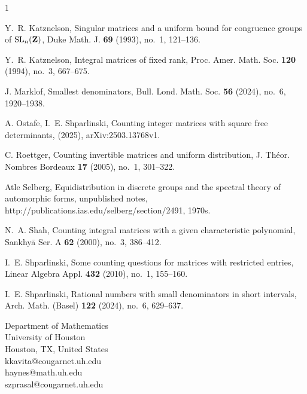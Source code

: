 \documentclass[reqno]{amsart}
\begin{document}
\begin{thebibliography}{1}
\vspace*{.1in}

Y.~R. Katznelson, Singular matrices and a uniform bound for congruence groups of ${\rm SL}_n({\bf Z})$, Duke Math. J. {\bf 69} (1993), no.~1, 121--136.

\vspace*{.1in}

Y.~R. Katznelson, Integral matrices of fixed rank, Proc. Amer. Math. Soc. {\bf 120} (1994), no.~3, 667--675.

\vspace*{.1in}

J. Marklof, Smallest denominators, Bull. Lond. Math. Soc. {\bf 56} (2024), no.~6, 1920--1938.
\vspace*{.1in}

%


A. Ostafe, I.~E. Shparlinski, Counting integer matrices with square free determinants, (2025), arXiv:2503.13768v1.

\vspace*{.1in}

C. Roettger, Counting invertible matrices and uniform distribution, J. Th\'eor. Nombres Bordeaux {\bf 17} (2005), no.~1, 301--322.

\vspace*{.1in}

Atle Selberg, Equidistribution in discrete groups and the spectral theory of automorphic
forms, unpublished notes, http://publications.ias.edu/selberg/section/2491, 1970s.

\vspace*{.1in}

N.~A. Shah, Counting integral matrices with a given characteristic polynomial, Sankhy\=a{} Ser. A {\bf 62} (2000), no.~3, 386--412.

\vspace*{.1in}

I.~E. Shparlinski, Some counting questions for matrices with restricted entries, Linear Algebra Appl. {\bf 432} (2010), no.~1, 155--160.

\vspace*{.1in}

I.~E. Shparlinski, Rational numbers with small denominators in short intervals, Arch. Math. (Basel) {\bf 122} (2024), no.~6, 629--637.



\end{thebibliography}
		
\vspace{.15in}
		
{\footnotesize
\noindent
Department of Mathematics\\
University of Houston\\
Houston, TX, United States\\
kkavita@cougarnet.uh.edu\\
haynes@math.uh.edu\\
szprasal@cougarnet.uh.edu
			
}
		
		
	
\end{document}
